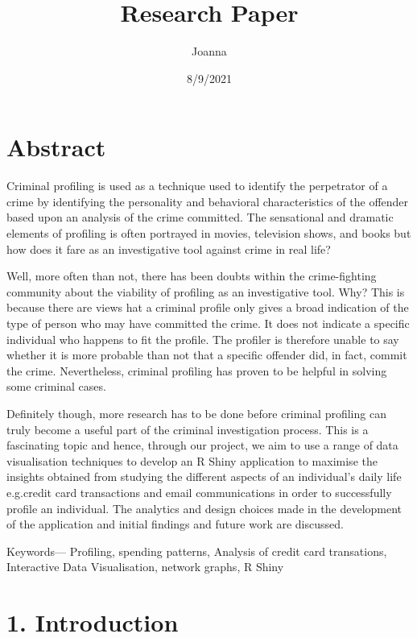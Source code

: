 \documentclass[
]{article}
\title{Research Paper}
\author{Joanna}
\date{8/9/2021}
\begin{document}
\maketitle

{
\setcounter{tocdepth}{2}
\tableofcontents
}
\hypertarget{abstract}{%
\section{Abstract}\label{abstract}}

Criminal profiling is used as a technique used to identify the perpetrator of a crime by identifying the personality and behavioral characteristics of the offender based upon an analysis of the crime committed. The sensational and dramatic elements of profiling is often portrayed in movies, television shows, and books but how does it fare as an investigative tool against crime in real life?

Well, more often than not, there has been doubts within the crime-fighting community about the viability of profiling as an investigative tool. Why? This is because there are views hat a criminal profile only gives a broad indication of the type of person who may have committed the crime. It does not indicate a specific individual who happens to fit the profile. The profiler is therefore unable to say whether it is more probable than not that a specific offender did, in fact, commit the crime. Nevertheless, criminal profiling has proven to be helpful in solving some criminal cases.

Definitely though, more research has to be done before criminal profiling can truly become a useful part of the criminal investigation process. This is a fascinating topic and hence, through our project, we aim to use a range of data visualisation techniques to develop an R Shiny application to maximise the insights obtained from studying the different aspects of an individual's daily life e.g.credit card transactions and email communications in order to successfully profile an individual. The analytics and design choices made in the development of the application and initial findings and future work are discussed.

Keywords--- Profiling, spending patterns, Analysis of credit card transations, Interactive Data Visualisation, network graphs, R Shiny

\hypertarget{introduction}{%
\section{1. Introduction}\label{introduction}}
\end{document}
